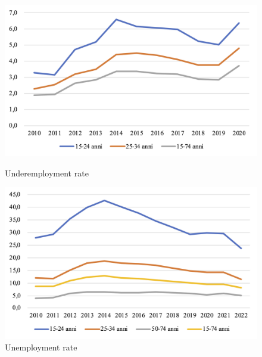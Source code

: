 \documentclass[12pt]{article}
\begin{document}
\begin{spacing}{1.5}
\begin{figure}
	\begin{minipage}[b]{0.5\textwidth}
		\begin{center}
			\includegraphics[width=\textwidth]{./images/underemployment-rate-age.png}
		\end{center}
			\caption{Underemployment rate}
	\end{minipage}
	\begin{minipage}[b]{0.5\textwidth}
		\begin{center}
			\includegraphics[width=\textwidth]{./images/unemployment-rate-age.png}
		\end{center}
			\caption{Unemployment rate}
	\end{minipage}
\end{figure}

%


\end{spacing}
\end{document}

